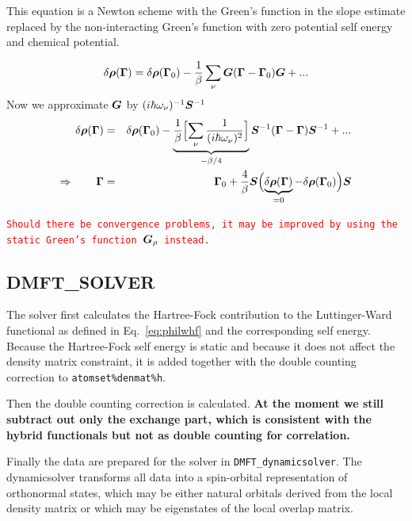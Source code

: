 \documentclass[11pt,a4paper]{report}
\newcommand{\petertt}[1]{\textcolor{red}{\texttt{#1}}}
\begin{document}
This equation is a Newton scheme with the Green's function in the
slope estimate replaced by the non-interacting Green's function with
zero potential self energy and chemical potential. 


\begin{eqnarray}
\delta\bm{\rho}(\bm{\Gamma})=\delta\bm{\rho}(\bm{\Gamma}_0)
-\frac{1}{\beta}\sum_\nu \bm{G}(\bm{\Gamma}-\bm{\Gamma}_0)\bm{G}+...
\end{eqnarray}
Now we approximate $\bm{G}$ by $(i\hbar\omega_\nu)^{-1}\bm{S}^{-1}$
\begin{eqnarray}
\delta\bm{\rho}(\bm{\Gamma})&=&\delta\bm{\rho}(\bm{\Gamma}_0)
-
\underbrace{\frac{1}{\beta}
\Bigl[\sum_\nu\frac{1}{(i\hbar\omega_\nu)^2} \Bigr]}
_{-\beta/4}
\bm{S}^{-1}(\bm{\Gamma}-\bm{\Gamma})\bm{S}^{-1}+...
\nonumber\\
\Rightarrow\qquad\bm{\Gamma}&=&\bm{\Gamma}_0
+\frac{4}{\beta}
\bm{S}
\Bigl(\underbrace{\delta\bm{\rho}(\bm{\Gamma})}_{=0}-\delta\bm{\rho}(\bm{\Gamma}_0)\Bigr)
\bm{S}
\end{eqnarray}


\petertt{Should
  there be convergence problems, it may be improved by using the
  static Green's function $\bm{G}_\rho$ instead.}




\subsection{DMFT\_SOLVER}
The solver first calculates the Hartree-Fock contribution to the
Luttinger-Ward functional as defined in Eq.~\ref{eq:philwhf} and the
corresponding self energy. Because the Hartree-Fock self energy is
static and because it does not affect the density matrix constraint,
it is added together with the double counting correction to
\verb|atomset%denmat%h|.


Then the double counting correction is calculated. \textbf{At the
  moment we still subtract out only the exchange part, which is
  consistent with the hybrid functionals but not as double counting
  for correlation.}

Finally the data are prepared for the solver in
\verb|DMFT_dynamicsolver|. The dynamicsolver transforms all data into
a spin-orbital representation of orthonormal states, which may be
either natural orbitals derived from the local density matrix or which
may be eigenstates of the local overlap matrix.
\end{document}

